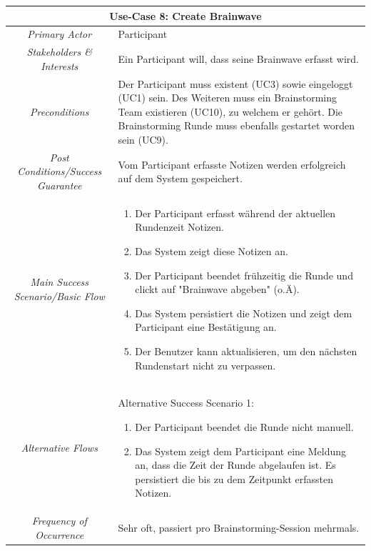 \renewcommand{\arraystretch}{1.35}
\begin{center}
	\begin{longtable}{| c | p{7cm} |}
		\hline
		\multicolumn{2}{|c|}{\textbf{Use-Case 8: Create Brainwave}}\\
		\hline\hline
		\textit{Primary Actor} & Participant\\
		\hline
		\textit{Stakeholders \& Interests} & Ein Participant will, dass seine Brainwave erfasst wird. \\
		\hline
		\textit{Preconditions} & Der Participant muss existent (UC3) sowie eingeloggt (UC1) sein. Des Weiteren muss ein Brainstorming Team existieren (UC10), zu welchem er gehört. Die Brainstorming Runde muss ebenfalls gestartet worden sein (UC9). \\
		\hline
		\textit{Post Conditions/Success Guarantee} & Vom Participant erfasste Notizen werden erfolgreich auf dem System gespeichert. \\
		\hline
		\textit{Main Success Scenario/Basic Flow} & 
		\begin{enumerate}[noitemsep]
			\item Der Participant erfasst während der aktuellen Rundenzeit Notizen.
			\item Das System zeigt diese Notizen an.
			\item Der Participant beendet frühzeitig die Runde und clickt auf "Brainwave abgeben" (o.Ä).
			\item Das System persistiert die Notizen und zeigt dem Participant eine Bestätigung an. 
			\item Der Benutzer kann aktualisieren, um den nächsten Rundenstart nicht zu verpassen.
		\end{enumerate}\\
		\hline
		\textit{Alternative Flows} &
		Alternative	Success Scenario 1:
		\begin{enumerate}[label=3.\alph*,noitemsep]
			\item Der Participant beendet die Runde nicht manuell.
			\item Das System zeigt dem Participant eine Meldung an, dass die Zeit der Runde abgelaufen ist. Es persistiert die bis zu dem Zeitpunkt erfassten Notizen.
		\end{enumerate}\\
	
		\hline
		
		\textit{Frequency of Occurrence} & Sehr oft, passiert pro Brainstorming-Session mehrmals.\\
		
		\hline
	\end{longtable}
\end{center}


